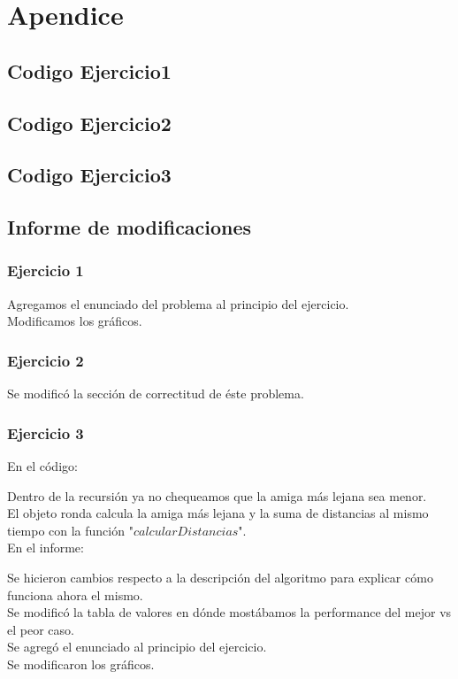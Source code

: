 \newpage
\section{Apendice}
\subsection{Codigo Ejercicio1}

\subsection{Codigo Ejercicio2}

\subsection{Codigo Ejercicio3}

\subsection{Informe de modificaciones}
\subsubsection{Ejercicio 1}
Agregamos el enunciado del problema al principio del ejercicio.\\
Modificamos los gr\'aficos.
\subsubsection{Ejercicio 2}
Se modific\'o la secci\'on de correctitud de \'este problema.
\subsubsection{Ejercicio 3}
En el c\'odigo:

Dentro de la recursi\'on ya no chequeamos que la amiga m\'as lejana sea menor.\\
El objeto ronda calcula la amiga m\'as lejana y la suma de distancias al mismo tiempo con la funci\'on "$calcularDistancias$".\\
En el informe:

Se hicieron cambios respecto a la descripci\'on del algoritmo para explicar c\'omo funciona ahora el mismo.\\
Se modific\'o la tabla de valores en d\'onde most\'abamos la performance del mejor vs el peor caso.\\
Se agreg\'o el enunciado al principio del ejercicio.\\
Se modificaron los gr\'aficos.